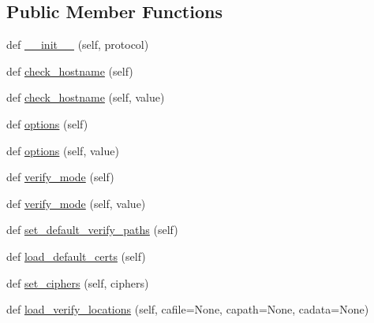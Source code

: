 \subsection*{Public Member Functions}
\begin{DoxyCompactItemize}
\item 
def \hyperlink{classpip_1_1__vendor_1_1urllib3_1_1contrib_1_1securetransport_1_1SecureTransportContext_a9c0772fa48e57acc6850cab82aebda5b}{\+\_\+\+\_\+init\+\_\+\+\_\+} (self, protocol)
\item 
def \hyperlink{classpip_1_1__vendor_1_1urllib3_1_1contrib_1_1securetransport_1_1SecureTransportContext_a4bee48e606df60979287dce78603eb7c}{check\+\_\+hostname} (self)
\item 
def \hyperlink{classpip_1_1__vendor_1_1urllib3_1_1contrib_1_1securetransport_1_1SecureTransportContext_ac7116cf8e9c1935d170cc74c6d8afa19}{check\+\_\+hostname} (self, value)
\item 
def \hyperlink{classpip_1_1__vendor_1_1urllib3_1_1contrib_1_1securetransport_1_1SecureTransportContext_a9442a02c94ce8e39bc9d76962265d6ed}{options} (self)
\item 
def \hyperlink{classpip_1_1__vendor_1_1urllib3_1_1contrib_1_1securetransport_1_1SecureTransportContext_ab7c0acf5972bc61c0b615dd1235d115b}{options} (self, value)
\item 
def \hyperlink{classpip_1_1__vendor_1_1urllib3_1_1contrib_1_1securetransport_1_1SecureTransportContext_ad6187e943847db3e063e02c9bfd12c67}{verify\+\_\+mode} (self)
\item 
def \hyperlink{classpip_1_1__vendor_1_1urllib3_1_1contrib_1_1securetransport_1_1SecureTransportContext_a0b4a14e42c1b267c5a48a478a6abbcac}{verify\+\_\+mode} (self, value)
\item 
def \hyperlink{classpip_1_1__vendor_1_1urllib3_1_1contrib_1_1securetransport_1_1SecureTransportContext_a216e7b72b229aecd13bb4f36ba2c1a11}{set\+\_\+default\+\_\+verify\+\_\+paths} (self)
\item 
def \hyperlink{classpip_1_1__vendor_1_1urllib3_1_1contrib_1_1securetransport_1_1SecureTransportContext_a2f69863d2df096a812f1591d47a35d92}{load\+\_\+default\+\_\+certs} (self)
\item 
def \hyperlink{classpip_1_1__vendor_1_1urllib3_1_1contrib_1_1securetransport_1_1SecureTransportContext_afb0595d1d25c897525e8968e804980d0}{set\+\_\+ciphers} (self, ciphers)
\item 
def \hyperlink{classpip_1_1__vendor_1_1urllib3_1_1contrib_1_1securetransport_1_1SecureTransportContext_a17a27a813fd689046806ac40ee661094}{load\+\_\+verify\+\_\+locations} (self, cafile=None, capath=None, cadata=None)

\end{DoxyCompactItemize}
